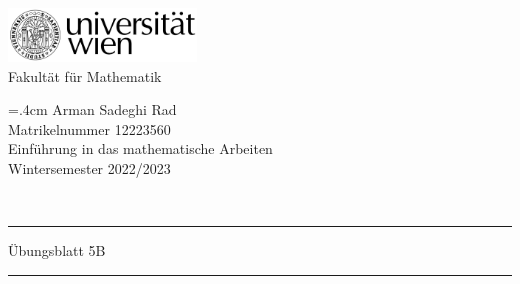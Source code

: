 \documentclass{article}
\theoremstyle{definition}
\begin{document}
	
	\thispagestyle{plain}
	\begin{minipage}{5cm}
		\includegraphics[width=5cm]{logo}\\
		\centering
		Fakultät für Mathematik
	\end{minipage}
	\hfill
	\begin{minipage}{7cm}
		\baselineskip=.4cm
		Arman Sadeghi Rad\\
		Matrikelnummer 12223560 \\
		Einführung in das mathematische Arbeiten \\
		Wintersemester 2022/2023
	\end{minipage}\\[1mm]
	\hrule height2pt \vskip1mm
	\noindent
	Übungsblatt 5B
	\hrule height2pt \vskip1mm
\end{document}

